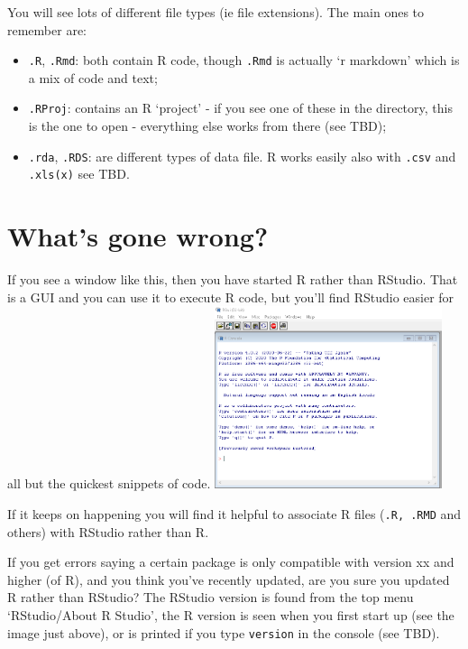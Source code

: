 \documentclass[
]{book}
\providecommand{\tightlist}{%
  \setlength{\itemsep}{0pt}\setlength{\parskip}{0pt}}
\begin{document}
You will see lots of different file types (ie file extensions). The main ones to remember are:

\begin{itemize}
\tightlist
\item
  \texttt{.R}, \texttt{.Rmd}: both contain R code, though \texttt{.Rmd} is actually `r markdown' which is a mix of code and text;
\item
  \texttt{.RProj}: contains an R `project' - if you see one of these in the directory, this is the one to open - everything else works from there (see TBD);
\item
  \texttt{.rda}, \texttt{.RDS}: are different types of data file. R works easily also with \texttt{.csv} and \texttt{.xls(x)} see TBD.
\end{itemize}

\hypertarget{whats-gone-wrong-1}{%
\section{What's gone wrong?}\label{whats-gone-wrong-1}}

If you see a window like this, then you have started R rather than RStudio. That is a GUI and you can use it to execute R code, but you'll find RStudio easier for all but the quickest snippets of code. \includegraphics[width=0.5\textwidth,height=\textheight]{images/RGui.png}

If it keeps on happening you will find it helpful to associate R files (\texttt{.R,\ .RMD} and others) with RStudio rather than R.

If you get errors saying a certain package is only compatible with version xx and higher (of R), and you think you've recently updated, are you sure you updated R rather than RStudio? The RStudio version is found from the top menu `RStudio/About R Studio', the R version is seen when you first start up (see the image just above), or is printed if you type \texttt{version} in the console (see TBD).
\end{document}
